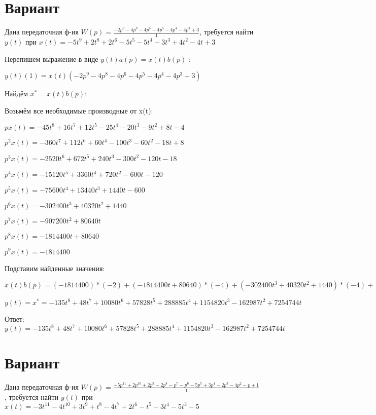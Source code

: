 \documentclass{article}
\begin{document}
{{{\section{Вариант}

Дана передаточная ф-ия $W(p)=\frac{-2p^{9}-4p^{8}-4p^{6}-4p^{5}-4p^{4}-4p^{3}+3}{1}$, требуется найти $y(t)$ при $x(t)=-5t^{9}+2t^{8}+2t^{6}-5t^{5}-5t^{4}-3t^{3}+4t^{2}-4t+3$

Перепишем выражение в виде $y(t)a(p)=x(t)b(p)$ :

$y(t)(1)=x(t)(-2p^{9}-4p^{8}-4p^{6}-4p^{5}-4p^{4}-4p^{3}+3)$

Найдём $x^*=x(t)b(p)$:

Возьмём все необходимые производные от x(t):

$px(t)=-45t^{8}+16t^{7}+12t^{5}-25t^{4}-20t^{3}-9t^{2}+8t-4$

$p^2x(t)=-360t^{7}+112t^{6}+60t^{4}-100t^{3}-60t^{2}-18t+8$

$p^3x(t)=-2520t^{6}+672t^{5}+240t^{3}-300t^{2}-120t-18$

$p^4x(t)=-15120t^{5}+3360t^{4}+720t^{2}-600t-120$

$p^5x(t)=-75600t^{4}+13440t^{3}+1440t-600$

$p^6x(t)=-302400t^{3}+40320t^{2}+1440$

$p^7x(t)=-907200t^{2}+80640t$

$p^8x(t)=-1814400t+80640$

$p^9x(t)=-1814400$

Подставим найденные значения:

$x(t)b(p) = (-1814400)*(-2)+(-1814400t+80640)*(-4)+(-302400t^{3}+40320t^{2}+1440)*(-4)+(-75600t^{4}+13440t^{3}+1440t-600)*(-4)+(-15120t^{5}+3360t^{4}+720t^{2}-600t-120)*(-4)+(-2520t^{6}+672t^{5}+240t^{3}-300t^{2}-120t-18)*(-4)+(-45t^{8}+16t^{7}+12t^{5}-25t^{4}-20t^{3}-9t^{2}+8t-4)*3=-135t^{8}+48t^{7}+10080t^{6}+57828t^{5}+288885t^{4}+1154820t^{3}-162987t^{2}+7254744t$





$y(t)=x^*=-135t^{8}+48t^{7}+10080t^{6}+57828t^{5}+288885t^{4}+1154820t^{3}-162987t^{2}+7254744t$

Ответ: $y(t) = -135t^{8}+48t^{7}+10080t^{6}+57828t^{5}+288885t^{4}+1154820t^{3}-162987t^{2}+7254744t$

\section{Вариант}

Дана передаточная ф-ия $W(p)=\frac{-5p^{11}+2p^{10}+2p^{9}-2p^{8}-p^{7}-p^{6}-5p^{5}+3p^{4}-2p^{3}-4p^{2}-p+1}{1}$, требуется найти $y(t)$ при $x(t)=-3t^{11}-4t^{10}+3t^{9}+t^{8}-4t^{7}+2t^{6}-t^{5}-3t^{4}-5t^{3}-5$

}}}
\end{document}
